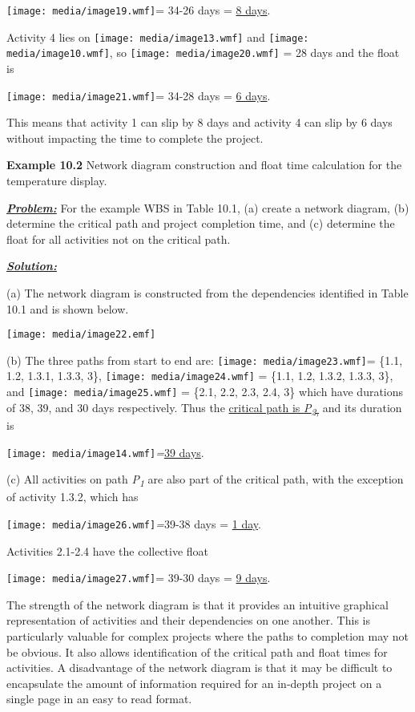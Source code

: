 \texttt{[image: media/image19.wmf]}=
34-26 days = \ul{8 days}.

Activity 4 lies on
\texttt{[image: media/image13.wmf]}
and
\texttt{[image: media/image10.wmf]},
so \texttt{[image: media/image20.wmf]} = 28 days and the float is

\texttt{[image: media/image21.wmf]}= 34-28 days = \ul{6 days}.

This means that activity 1 can slip by 8 days and activity 4 can slip by
6 days without impacting the time to complete the project.

\textbf{Example 10.2} Network diagram construction and float time
calculation for the temperature display.

\emph{\textbf{\ul{Problem:}}} For the example WBS in Table 10.1, (a)
create a network diagram, (b) determine the critical path and project
completion time, and (c) determine the float for all activities not on
the critical path.

\textbf{\ul{\emph{Solution:}}}

(a) The network diagram is constructed from the dependencies identified
in Table 10.1 and is shown below.

\texttt{[image: media/image22.emf]}

(b) The three paths from start to end are:
\texttt{[image: media/image23.wmf]}= \{1.1, 1.2, 1.3.1, 1.3.3, 3\},
\texttt{[image: media/image24.wmf]} = \{1.1, 1.2, 1.3.2, 1.3.3, 3\}, and
\texttt{[image: media/image25.wmf]} = \{2.1, 2.2, 2.3, 2.4, 3\} which
have durations of 38, 39, and 30 days respectively. Thus the
\ul{critical path is \emph{P\textsubscript{2,}}} and its duration is

\texttt{[image: media/image14.wmf]}\emph{=}\ul{39
days}.

(c) All activities on path \emph{P\textsubscript{1}} are also part of
the critical path, with the exception of activity 1.3.2, which has

\texttt{[image: media/image26.wmf]}\emph{=}39-38 days = \ul{1 day}.

Activities 2.1-2.4 have the collective float

\texttt{[image: media/image27.wmf]}= 39-30 days = \ul{9 days}.

The strength of the network diagram is that it provides an intuitive
graphical representation of activities and their dependencies on one
another. This is particularly valuable for complex projects where the
paths to completion may not be obvious. It also allows identification of
the critical path and float times for activities. A disadvantage of the
network diagram is that it may be difficult to encapsulate the amount of
information required for an in-depth project on a single page in an easy
to read format.

